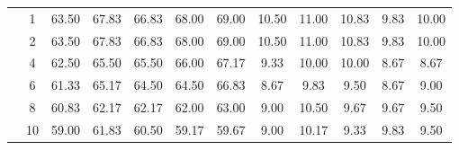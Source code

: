 \begin{table}[H]
\begin{tabular}{|c|c|c c c c c|c c c c c|}
\multicolumn{1}{|c|}{ \multirow{5}{*}{\rotatebox[origin=c]{90}{\textbf{K-vizinhos}}} }
&1	&63.50&	67.83&	66.83&	68.00&	69.00&	10.50	&11.00	&10.83	&9.83	&10.00	\\\cline{2-12}
&2	&63.50&	67.83&	66.83&	68.00&	69.00&	10.50	&11.00	&10.83	&9.83	&10.00	\\\cline{2-12}
&4	&62.50&	65.50&	65.50&	66.00&	67.17&	9.33	&10.00	&10.00	&8.67	&8.67	\\\cline{2-12}
&6	&61.33&	65.17&	64.50&	64.50&	66.83&	8.67&	9.83&	9.50	&8.67	&9.00	\\\cline{2-12}
&8	&60.83&	62.17&	62.17&	62.00&	63.00&	9.00&	10.50&	9.67	&9.67	&9.50	\\\cline{2-12}
&10	&59.00&	61.83&	60.50&	59.17&	59.67&	9.00&	10.17&	9.33	&9.83	&9.50	


\\\midrule

	\end{tabular}
\end{table}







